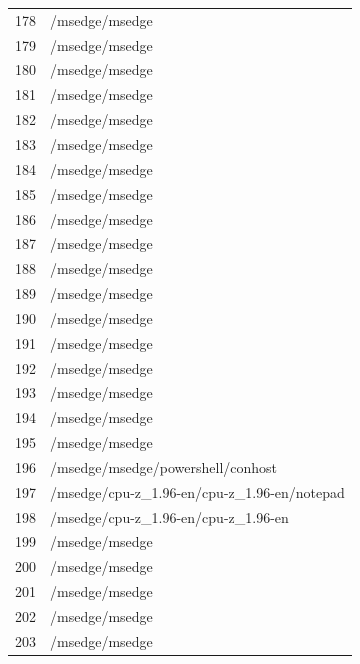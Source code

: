 \documentclass[a4paper,twoside,12pt]{book}
\begin{document}
\begin{appendices}
\begin{table}
\begin{tabular}{ll}
		178 &                                     /msedge/msedge \\
		179 &                                     /msedge/msedge \\
		180 &                                     /msedge/msedge \\
		181 &                                     /msedge/msedge \\
		182 &                                     /msedge/msedge \\
		183 &                                     /msedge/msedge \\
		184 &                                     /msedge/msedge \\
		185 &                                     /msedge/msedge \\
		186 &                                     /msedge/msedge \\
		187 &                                     /msedge/msedge \\
		188 &                                     /msedge/msedge \\
		189 &                                     /msedge/msedge \\
		190 &                                     /msedge/msedge \\
		191 &                                     /msedge/msedge \\
		192 &                                     /msedge/msedge \\
		193 &                                     /msedge/msedge \\
		194 &                                     /msedge/msedge \\
		195 &                                     /msedge/msedge \\
		196 &                  /msedge/msedge/powershell/conhost \\
		197 &        /msedge/cpu-z\_1.96-en/cpu-z\_1.96-en/notepad \\
		198 &                /msedge/cpu-z\_1.96-en/cpu-z\_1.96-en \\
		199 &                                     /msedge/msedge \\
		200 &                                     /msedge/msedge \\
		201 &                                     /msedge/msedge \\
		202 &                                     /msedge/msedge \\
		203 &                                     /msedge/msedge \\

\end{tabular}
\end{table}
\end{appendices}
\end{document}
